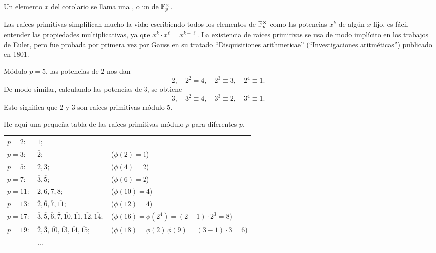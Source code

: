 \documentclass{article}
\theoremstyle{plain}
\begin{document}
\begin{definicion}
  Un elemento $x$ del corolario se llama una , o
  un  de $\mathbb{F}_p^\times$.
\end{definicion}

Las raíces primitivas simplifican mucho la vida: escribiendo todos los elementos
de $\mathbb{F}_p^\times$ como las potencias $x^k$ de algún $x$ fijo, es fácil entender
las propiedades multiplicativas, ya que $x^k\cdot x^\ell = x^{k+\ell}$.
La existencia de raíces primitivas se usa de modo implícito en los trabajos de
Euler, pero fue probada por primera vez por Gauss en su tratado ``Disquisitiones
arithmeticae'' (``Investigaciones aritméticas'') publicado en 1801.

\begin{ejemplo}
  Módulo $p = 5$, las potencias de $2$ nos dan
  $$2, \quad 2^2 = 4, \quad 2^3 \equiv 3, \quad 2^4 \equiv 1.$$
  De modo similar, calculando las potencias de $3$, se obtiene
  $$3, \quad 3^2 \equiv 4, \quad 3^3 \equiv 2, \quad 3^4 \equiv 1.$$
  Esto significa que $2$ y $3$ son raíces primitivas módulo $5$.
\end{ejemplo}

\begin{ejemplo}
  He aquí una pequeña tabla de las raíces primitivas módulo $p$ para diferentes
  $p$.

\begin{center}
  \begin{tabular}{lll}
    $p=2\colon$ & $\overline{1};$ \\
    $p=3\colon$ & $\overline{2};$ & ($\phi (2) = 1$) \\
    $p=5\colon$ & $\overline{2}, \overline{3};$ & ($\phi (4) = 2$) \\
    $p=7\colon$ & $\overline{3}, \overline{5};$ & ($\phi (6) = 2$) \\
    $p=11\colon$ & $\overline{2}, \overline{6}, \overline{7}, \overline{8};$ & ($\phi (10) = 4$) \\
    $p=13\colon$ & $\overline{2}, \overline{6}, \overline{7}, \overline{11};$ & ($\phi (12) = 4$) \\
    $p=17\colon$ & $\overline{3}, \overline{5}, \overline{6}, \overline{7}, \overline{10}, \overline{11}, \overline{12}, \overline{14};$ & ($\phi (16) = \phi (2^4) = (2-1)\cdot 2^3 = 8$) \\
    $p=19\colon$ & $\overline{2}, \overline{3}, \overline{10}, \overline{13}, \overline{14}, \overline{15};$ & ($\phi (18) = \phi (2)\,\phi (9) = (3-1)\cdot 3 = 6$) \\
                & $\ldots$
  \end{tabular}
\end{center}
\end{ejemplo}
\end{document}

